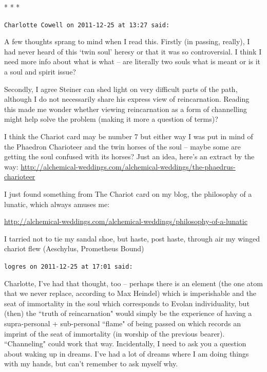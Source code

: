 
\begin{center}* * *\end{center}

\begin{footnotesize}\begin{sffamily}



\texttt{Charlotte Cowell on 2011-12-25 at 13:27 said: }

A few thoughts sprang to mind when I read this. Firstly (in passing, really), I had never heard of this `twin soul' heresy or that it was so controversial. I think I need more info about what is what – are literally two souls what is meant or is it a soul and spirit issue?

Secondly, I agree Steiner can shed light on very difficult parts of the path, although I do not necessarily share his express view of reincarnation. Reading this made me wonder whether viewing reincarnation as a form of channelling might help solve the problem (making it more a question of terms)?

I think the Chariot card may be number 7 but either way I was put in mind of the Phaedron Charioteer and the twin horses of the soul – maybe some are getting the soul confused with its horses? Just an idea, here's an extract by the way: \url{http://alchemical-weddings.com/alchemical-weddings/the-phaedrus-charioteer}

I just found something from The Chariot card on my blog, the philosophy of a lunatic, which always amuses me:

\url{http://alchemical-weddings.com/alchemical-weddings/philosophy-of-a-lunatic}

I tarried not to tie my sandal shoe, but haste, post haste, through air my winged chariot flew (Aeschylus, Prometheus Bound)


\hfill

\texttt{logres on 2011-12-25 at 17:01 said: }

Charlotte, I've had that thought, too – perhaps there is an element (the one atom that we never replace, according to Max Heindel) which is imperishable and the seat of immortality in the soul which corresponds to Evolan individuality, but (then) the ``truth of reincarnation" would simply be the experience of having a supra-personal + sub-personal ``flame" of being passed on which records an imprint of the seat of immortality (in worship of the previous bearer). ``Channeling" could work that way. Incidentally, I need to ask you a question about waking up in dreams. I've had a lot of dreams where I am doing things with my hands, but can't remember to ask myself why.



\end{sffamily}
\end{footnotesize}
